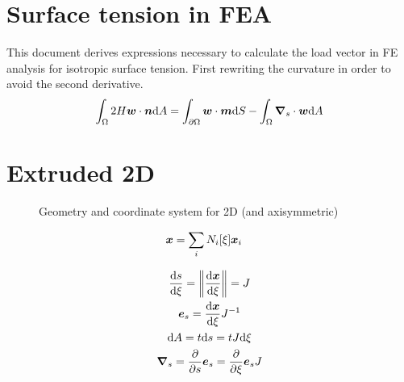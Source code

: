 \documentclass[a4paper,11pt]{article}
\renewcommand{\to}[1]{\text{\boldmath $#1$}} %
\newcommand{\intd}[1]{{\rm d}#1}
\newcommand{\pderiv}[2]{\frac{\partial#1}{\partial#2}}
\newcommand{\dderiv}[2]{\frac{{\rm d}#1}{{\rm d}#2}}
\newcommand{\norm}[1]{\left\lVert{#1}\right\rVert}
\begin{document}
\section{Surface tension in FEA}
This document derives expressions necessary to calculate the load vector in FE analysis for isotropic surface tension. First rewriting the curvature in order to avoid the second derivative.
\begin{align}
 \int_\Omega 2 H \to w\cdot \to n\intd A = \int_{\partial\Omega} \to w\cdot\to m\intd S - \int_\Omega \to \nabla_s \cdot \to w \intd A
\end{align}


\section{Extruded 2D}

\begin{figure}[htpb]
 \centering
 \caption{Geometry and coordinate system for 2D (and axisymmetric)}
\end{figure}

\begin{align}
 \to x &= \sum_i N_i[\xi]\to x_i
\end{align}

\begin{gather}
 \dderiv{s}{\xi} = \norm{\dderiv{\to x}{\xi}} = J\\
 \to e_s = \dderiv{\to x}{\xi} J^{-1}\\
 \intd A = t \intd s = t J \intd \xi\\
 \to \nabla_s = \pderiv{}{s}\to e_s = \pderiv{}{\xi}\to e_s J
\end{gather}
\end{document}
